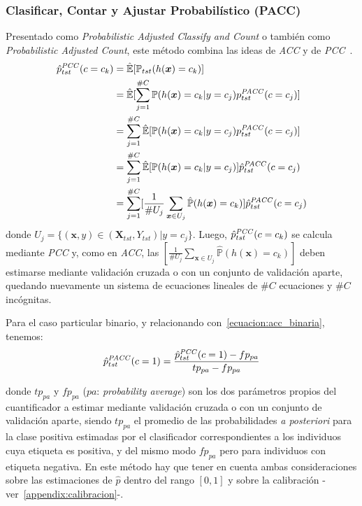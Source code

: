 \subsubsection{Clasificar, Contar y Ajustar Probabilístico
(PACC)}\label{puntual:pacc}

Presentado como {\it Probabilistic Adjusted Classify and Count\/} o también como
{\it Probabilistic Adjusted Count}, este método combina las ideas de {\it ACC\/}
y de {\it PCC}~\cite{bella2010quantification, tang2010network}.
\begin{align}
\begin{split}
    \hat p^{\it{PCC}}_{tst}(c=c_k) &= \mathbb{\hat E}[\mathbb{P}_{tst}(h(\boldsymbol{x})=c_k)] \\
    &= \mathbb{\hat E}[\sum \limits_{j=1}^{\#C}{\mathbb{P}(h(\boldsymbol{x})=c_k|y=c_j) p^{\it{PACC}}_{tst}(c=c_j)}] \\
    &= \sum \limits_{j=1}^{\#C}\mathbb{\hat E}[{\mathbb{P}(h(\boldsymbol{x})=c_k|y=c_j) p^{\it{PACC}}_{tst}(c=c_j)}] \\
    &= \sum \limits_{j=1}^{\#C}\mathbb{\hat E}[{\mathbb{P}(h(\boldsymbol{x})=c_k|y=c_j)}] \hat p^{\it{PACC}}_{tst}(c=c_j) \\
    &= \sum \limits_{j=1}^{\#C} [\frac {1}{\#U_j} \sum_{\boldsymbol{x} \in U_j} \mathbb{\hat P}(h(\boldsymbol{x})=c_k)] \hat p^{\it{PACC}}_{tst}(c=c_j)
\end{split}
\end{align}
donde $U_j=\{(\boldsymbol{x}, y) \in (\boldsymbol{X}_{tst}, Y_{tst}) | y=c_j\}$.
Luego, $\hat p^{\it{PCC}}_{tst}(c=c_k)$ se calcula mediante {\it PCC\/} y, como
en {\it ACC}, las $[\frac {1}{\#U_j} \sum_{\boldsymbol{x} \in U_j}
\mathbb{\hat{P}}(h(\boldsymbol{x})=c_k)]$ deben estimarse mediante validación
cruzada o con un conjunto de validación aparte, quedando nuevamente un sistema
de ecuaciones lineales de $\#C$ ecuaciones y $\#C$ incógnitas.

Para el caso particular binario, y relacionando con~\ref{ecuacion:acc_binaria},
tenemos:
\begin{equation}
    \hat p^{\it{PACC}}_{tst}(c=1) = \frac{\hat p^{\it{PCC}}_{tst}(c=1)-fp_{pa}}{tp_{pa}-fp_{pa}}
\end{equation}

donde $tp_{pa}$ y $fp_{pa}$ ($pa$: {\it probability average\/}) son los dos
parámetros propios del cuantificador a estimar mediante validación cruzada o con
un conjunto de validación aparte, siendo $tp_{pa}$ el promedio de las
probabilidades {\it a posteriori\/} para la clase positiva estimadas por el
clasificador correspondientes a los individuos cuya etiqueta es positiva, y del
mismo modo $fp_{pa}$ pero para individuos con etiqueta negativa. En este método
hay que tener en cuenta ambas consideraciones sobre las estimaciones de $\hat p$
dentro del rango $[0, 1]$ y sobre la calibración
-ver~\ref{appendix:calibracion}-.

